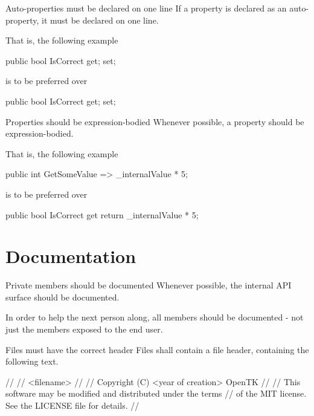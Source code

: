 \documentclass[11pt,a4paper]{article}
\begin{document}
\begin{must}{Auto-properties must be declared on one line}
If a property is declared as an auto-property, it must be declared on one line.
\end{must}

That is, the following example 
\begin{code}
public bool IsCorrect { get; set; }
\end{code}

is to be preferred over

\begin{code}
public bool IsCorrect 
{
    get; 
    set; 
}
\end{code}

\begin{should}{Properties should be expression-bodied}
Whenever possible, a property should be expression-bodied.
\end{should}

That is, the following example 
\begin{code}
public int GetSomeValue => _internalValue * 5;
\end{code}

is to be preferred over

\begin{code}
public bool IsCorrect 
{
    get
    {
        return _internalValue * 5;
    }
}
\end{code}


\section{Documentation}
\begin{should}{Private members should be documented}
Whenever possible, the internal API surface should be documented.
\end{should}

In order to help the next person along, all members should be documented - not just the members exposed to the end user.

\begin{must}{Files must have the correct header}
Files shall contain a file header, containing the following text.
\end{must}

\begin{code}
// 
//  <filename>
//
//  Copyright (C) <year of creation> OpenTK
//
//  This software may be modified and distributed under the terms
//  of the MIT license. See the LICENSE file for details.
//
\end{code}
\end{document}
